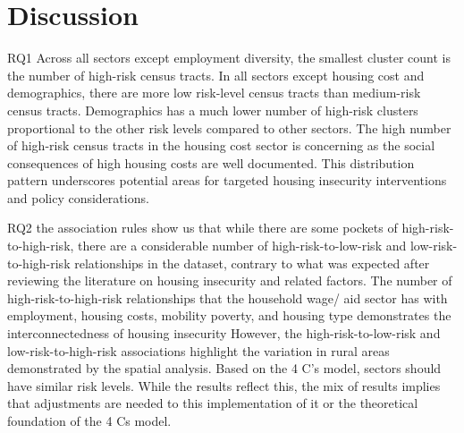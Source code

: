 \chapter{Discussion}	

RQ1 Across all sectors except employment diversity, the smallest cluster count is the number of high-risk census tracts. In all sectors except housing cost and demographics, there are more low risk-level census tracts than medium-risk census tracts. Demographics has a much lower number of high-risk clusters proportional to the other risk levels compared to other sectors. The high number of high-risk census tracts in the housing cost sector is concerning as the social consequences of high housing costs are well documented. This distribution pattern underscores potential areas for targeted housing insecurity interventions and policy considerations. 

RQ2 the association rules show us that while there are some pockets of high-risk-to-high-risk, there are a considerable number of high-risk-to-low-risk and low-risk-to-high-risk relationships in the dataset, contrary to what was expected after reviewing the literature on housing insecurity and related factors. The number of high-risk-to-high-risk relationships that the household wage/ aid sector has with employment, housing costs, mobility poverty, and housing type demonstrates the interconnectedness of housing insecurity However, the high-risk-to-low-risk and low-risk-to-high-risk associations highlight the variation in rural areas demonstrated by the spatial analysis. Based on the 4 C’s model, sectors should have similar risk levels. While the results reflect this, the mix of results implies that adjustments are needed to this implementation of it or the theoretical foundation of the 4 Cs model.  

